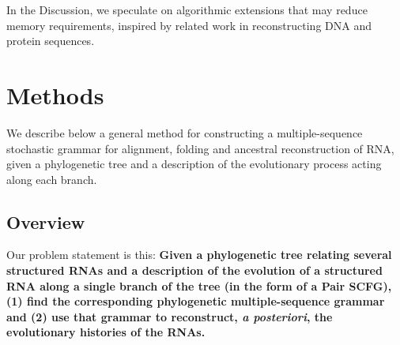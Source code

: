 \documentclass[10pt]{article}
\begin{document}
In the Discussion, we speculate on algorithmic extensions that
may reduce memory requirements, inspired by related work in
reconstructing DNA and protein sequences.



\newpage
\section*{Methods}
We describe below a general method for constructing a multiple-sequence
stochastic grammar for alignment, folding and ancestral reconstruction of RNA,
given a phylogenetic tree and a description of the evolutionary
process acting along each branch.

% 


\subsection*{Overview}

Our problem statement is this:
\textbf{Given a phylogenetic tree relating several structured RNAs and a
  description of the evolution of a structured RNA
  along a single branch of the tree (in the form of a Pair SCFG),
  (1) find the corresponding
  phylogenetic multiple-sequence grammar and (2) use that grammar to
  reconstruct, {\em a posteriori}, the evolutionary histories of the
  RNAs.}
\end{document}
